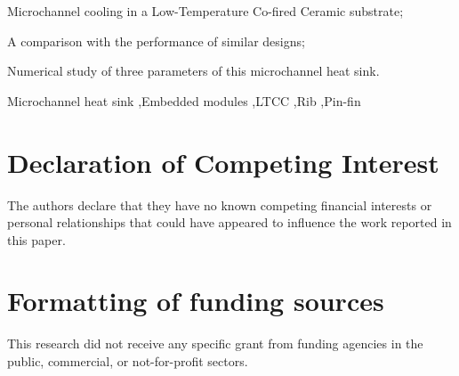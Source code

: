 \documentclass[preprint,5p,sort&compress,times,10pt]{elsarticle}                                             %
\newcommand{\Process}{2-Manuscript-EN}
\begin{document}
\begin{frontmatter}
    \begin{highlights}
        \item Microchannel cooling in a Low-Temperature Co-fired Ceramic substrate;
        \item A comparison with the performance of similar designs;
        \item Numerical study of three parameters of this microchannel heat sink.
    \end{highlights}

    \begin{keyword}
        Microchannel heat sink \sep Embedded modules \sep LTCC \sep Rib \sep Pin-fin
    \end{keyword}

\end{frontmatter}














\section*{Declaration of Competing Interest}
The authors declare that they have no known competing financial interests or personal relationships that could have appeared to influence the work reported in this paper.
\section*{Formatting of funding sources}
This research did not receive any specific grant from funding agencies in the public, commercial, or not-for-profit sectors.


\end{document}
